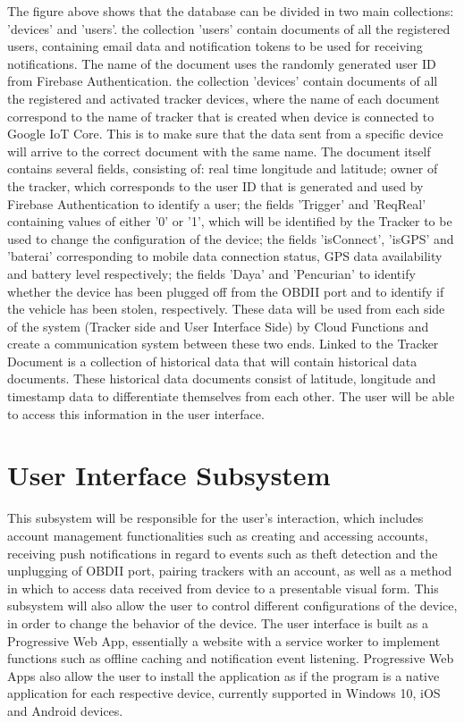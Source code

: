 \documentclass[conference]{IEEEtran}
\begin{document}
The figure above shows that the database can be divided in two main collections: 'devices' and 'users'. the collection 'users' contain documents of all the registered users, containing email data and notification tokens to be used for receiving notifications. The name of the document uses 
the randomly generated user ID from Firebase Authentication. the collection 'devices' contain documents of all the registered and activated tracker devices, where the name of each document correspond to the name of tracker that is created when device is connected to Google IoT Core. This is to 
make sure that the data sent from a specific device will arrive to the correct document with the same name. The document itself contains several fields, consisting of: real time longitude and latitude; owner of the tracker, which corresponds to the user ID that is generated and used by Firebase 
Authentication to identify a user; the fields 'Trigger' and 'ReqReal' containing values of either '0' or '1', which will be identified by the Tracker to be used to change the configuration of the device; the fields 'isConnect', 'isGPS' and 'baterai' corresponding to mobile data connection status, GPS data 
availability and battery level respectively; the fields 'Daya' and 'Pencurian' to identify whether the device has been plugged off from the OBDII port and to identify if the vehicle has been stolen, respectively. These data will be used from each side of the system (Tracker side and User Interface Side) by 
Cloud Functions and create a communication system between these two ends. Linked to the Tracker Document is a collection of historical data that will contain historical data documents. These historical data documents consist of latitude, longitude and timestamp data to differentiate themselves from each other. The 
user will be able to access this information in the user interface.

\section{User Interface Subsystem}
This subsystem will be responsible for the user’s interaction, which includes account management functionalities such as creating and accessing accounts, receiving push notifications in regard to events such as theft detection and the unplugging of OBDII port, pairing trackers with an account, as well as a method in which to access data received from device to a presentable visual form. 
This subsystem will also allow the user to control different configurations of the device, in order to change the behavior of the device. The user interface is built as a Progressive Web App, essentially a website with a service worker to implement functions such as offline caching and notification event listening. Progressive Web Apps also allow the user to install the application as if the program 
is a native application for each respective device, currently supported in Windows 10, iOS and Android devices. 
\end{document}
